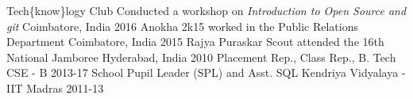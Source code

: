 \begin{cvhonors}
  \cvhonor
    {Tech\{know\}logy Club}
    {Conducted a workshop on \textit{Introduction to Open Source and git}}
    {Coimbatore, India}
    {2016}
  \cvhonor
    {Anokha 2k15}
    {worked in the Public Relations Department}
    {Coimbatore, India}
    {2015}
  \cvhonor
    {Rajya Puraskar Scout}
    {attended the 16th National Jamboree}
    {Hyderabad, India}
    {2010}
   \cvhonor
    {Placement Rep., Class Rep.,}
    {B. Tech CSE - B}
    {\empty}
    {2013-17}
   \cvhonor
    {School Pupil Leader (SPL) and Asst. SQL}
    {Kendriya Vidyalaya - IIT Madras}
    {\empty}
    {2011-13}
\end{cvhonors}